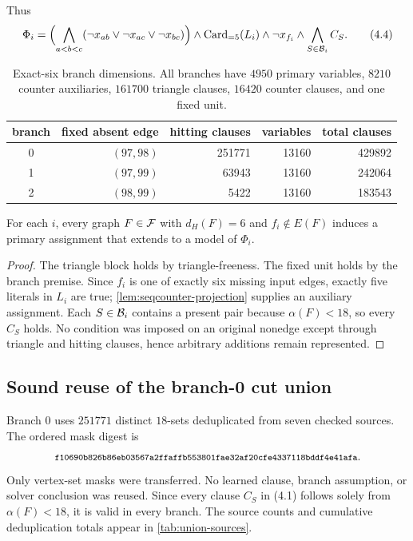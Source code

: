 Thus
\[
 \Phi_i=\Bigl(\bigwedge_{a<b<c}
   (\neg x_{ab}\lor\neg x_{ac}\lor\neg x_{bc})\Bigr)
 \land \operatorname{Card}_{=5}(L_i)
 \land \neg x_{f_i}
 \land \bigwedge_{S\in\mathcal B_i} C_S.                \tag{4.4}
\]

\begin{table}[H]
\centering
\caption{Exact-six branch dimensions.  All branches have \(4950\) primary
variables, \(8210\) counter auxiliaries, \(161700\) triangle clauses, \(16420\)
counter clauses, and one fixed unit.}\label{tab:budget6-branches}
\begin{tabular}{@{}crrrr@{}}
\toprule
branch & fixed absent edge & hitting clauses & variables & total clauses\\
\midrule
0 & \((97,98)\) & 251771 & 13160 & 429892\\
1 & \((97,99)\) &  63943 & 13160 & 242064\\
2 & \((98,99)\) &   5422 & 13160 & 183543\\
\bottomrule
\end{tabular}
\end{table}

\begin{proposition}\label{prop:cnf-sound}
For each \(i\), every graph \(F\in\mathcal F\) with \(d_H(F)=6\) and
\(f_i\notin E(F)\) induces a primary assignment that extends to a model of
\(\Phi_i\).
\end{proposition}

\begin{proof}
The triangle block holds by triangle-freeness.  The fixed unit holds by the
branch premise.  Since \(f_i\) is one of exactly six missing input edges,
exactly five literals in \(L_i\) are true; \cref{lem:seqcounter-projection}
supplies an auxiliary assignment.  Each \(S\in\mathcal B_i\) contains a
present pair because \(\alpha(F)<18\), so every \(C_S\) holds.  No condition
was imposed on an original nonedge except through triangle and hitting
clauses, hence arbitrary additions remain represented.
\end{proof}

\subsection{Sound reuse of the branch-0 cut union}

Branch \(0\) uses \(251771\) distinct \(18\)-sets deduplicated from seven
checked sources.  The ordered mask digest is
\[
\sha{f10690b826b86eb03567a2ffaffb553801fae32af20cfe4337118bddf4e41afa}.
\]
Only vertex-set masks were transferred.  No learned clause, branch
assumption, or solver conclusion was reused.  Since every clause \(C_S\) in
(4.1) follows solely from \(\alpha(F)<18\), it is valid in every branch.
The source counts and cumulative deduplication totals appear in
\cref{tab:union-sources}.

